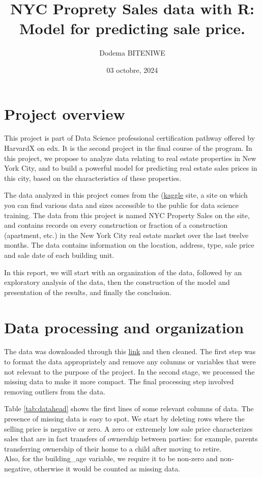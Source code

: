 \documentclass[
]{article}
\title{NYC Proprety Sales data with R: Model for predicting sale price.}
\author{Dodema BITENIWE}
\date{03 octobre, 2024}
\begin{document}
\maketitle

{
\hypersetup{linkcolor=}
\setcounter{tocdepth}{2}
\tableofcontents
}
\newpage

\section{Project overview}\label{project-overview}

This project is part of Data Science professional certification pathway offered by HarvardX on edx. It is the second project in the final course of the program. In this project, we propose to analyze data relating to real estate properties in New York City, and to build a powerful model for predicting real estate sales prices in this city, based on the characteristics of these properties.

The data analyzed in this project comes from the (\href{https://www.kaggle.com/datasets}{kaggle} site, a site on which you can find various data and sizes accessible to the public for data science training. The data from this project is named NYC Property Sales on the site, and contains records on every construction or fraction of a construction (apartment, etc.) in the New York City real estate market over the last twelve months. The data contains information on the location, address, type, sale price and sale date of each building unit.

In this report, we will start with an organization of the data, followed by an exploratory analysis of the data, then the construction of the model and presentation of the results, and finally the conclusion.

\section{Data processing and organization}\label{data-processing-and-organization}

The data was downloaded through this \href{https://www.kaggle.com/datasets/new-york-city/nyc-property-sales}{link} and then cleaned. The first step was to format the data appropriately and remove any columns or variables that were not relevant to the purpose of the project. In the second stage, we processed the missing data to make it more compact. The final processing step involved removing outliers from the data.

Table \ref{tab:datahead} shows the first lines of some relevant columns of data. The presence of missing data is easy to spot. We start by deleting rows where the selling price is negative or zero. A zero or extremely low sale price characterizes sales that are in fact transfers of ownership between parties: for example, parents transferring ownership of their home to a child after moving to retire.\\
Also, for the building\_age variable, we require it to be non-zero and non-negative, otherwise it would be counted as missing data.
\end{document}

